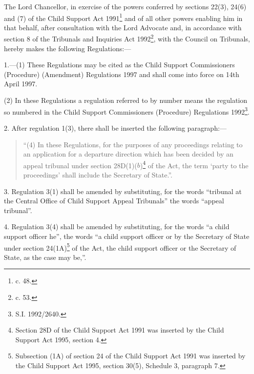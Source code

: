 \documentclass[12pt,a4paper]{article}
\title{\regstitle}
\author{S.I. 1997 No. 802}
\date{Made 12th March 1997\\Laid before Parliament 13th March 1997\\Coming into force 14th April 1997}
\begin{document}
\maketitle

\noindent
The Lord Chancellor, in exercise of the powers conferred by sections 22(3), 24(6) and (7) of the Child Support Act 1991\footnote{ c. 48.} and of all other powers enabling him in that behalf, after consultation with the Lord Advocate and, in accordance with section 8 of the Tribunals and Inquiries Act 1992\footnote{ c. 53.}, with the Council on Tribunals, hereby makes the following Regulations:—


%
%

\bigskip

\setcounter{secnumdepth}{-2}

1.—(1) These Regulations may be cited as the Child Support Commissioners (Procedure) (Amendment) Regulations 1997 and shall come into force on 14th April 1997.

(2) In these Regulations a regulation referred to by number means the regulation so numbered in the Child Support Commissioners (Procedure) Regulations 1992\footnote{\frenchspacing S.I. 1992/2640.}.

\medskip

2.  After regulation 1(3), there shall be inserted the following paragraph:—
\begin{quotation}
“(4) In these Regulations, for the purposes of any proceedings relating to an application for a departure direction which has been decided by an appeal tribunal under section 28D(1)($b$)\footnote{\frenchspacing Section 28D of the Child Support Act 1991 was inserted by the Child Support Act 1995, section 4.} of the Act, the term ‘party to the proceedings’ shall include the Secretary of State.”.
\end{quotation}

\medskip

3.  Regulation 3(1) shall be amended by substituting, for the words “tribunal at the Central Office of Child Support Appeal Tribunals” the words “appeal tribunal”.

\medskip

4.  Regulation 3(4) shall be amended by substituting, for the words “a child support officer he”, the words “a child support officer or by the Secretary of State under section 24(1A)\footnote{\frenchspacing Subsection (1A) of section 24 of the Child Support Act 1991 was inserted by the Child Support Act 1995, section 30(5), Schedule 3, paragraph 7.} of the Act, the child support officer or the Secretary of State, as the case may be,”.
\end{document}
